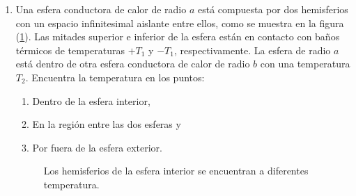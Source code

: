 \begin{enumerate}
    \item Una esfera conductora de calor de radio $a$ está compuesta por dos hemisferios con un espacio infinitesimal aislante entre ellos, como se muestra en la figura (\ref{fig:figura2}). Las mitades superior e inferior de la esfera están en contacto con baños térmicos de temperaturas $+ T_{1}$ y $-T_{1}$, respectivamente. La esfera de radio $a$ está dentro de otra esfera conductora de calor de radio $b$ con una temperatura $T_{2}$. Encuentra la temperatura en los puntos:
    \begin{enumerate}
    \item Dentro de la esfera interior,
    \item En la región entre las dos esferas y
    \item Por fuera de la esfera exterior.
    \end{enumerate} 
    \begin{figure}[!ht]
        \centering
        
        \caption{Los hemisferios de la esfera interior se encuentran a diferentes temperatura.}
        \label{fig:figura2}
    \end{figure}

\end{enumerate}
